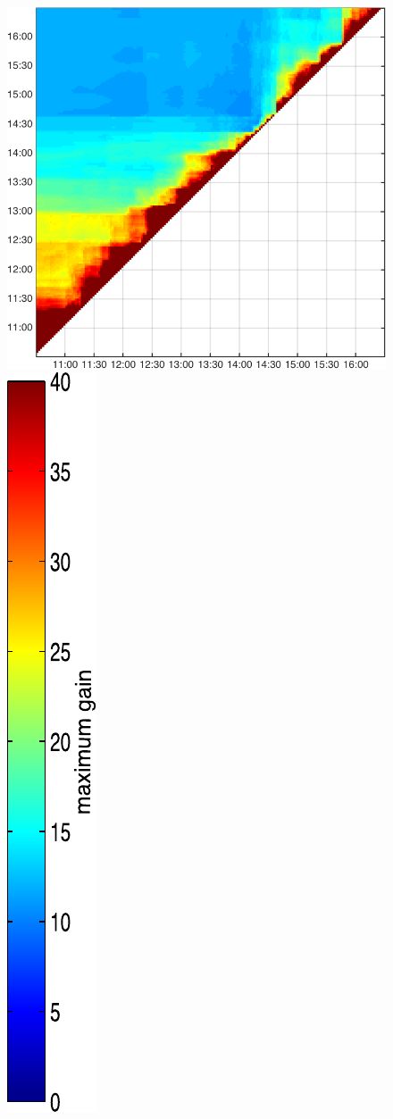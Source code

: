 \begin{figure}
\begin{minipage}[c]{\mylength}
\includegraphics[valign=t,width=\eventswidth]{events/20131119-maxGain-local-events.png}
\includegraphics[valign=t,trim=2pt -8pt 0 5pt,width=\colorbarwidth,totalheight=\eventheight]{events/colorbar-40.pdf}

\end{minipage}
\end{figure}

